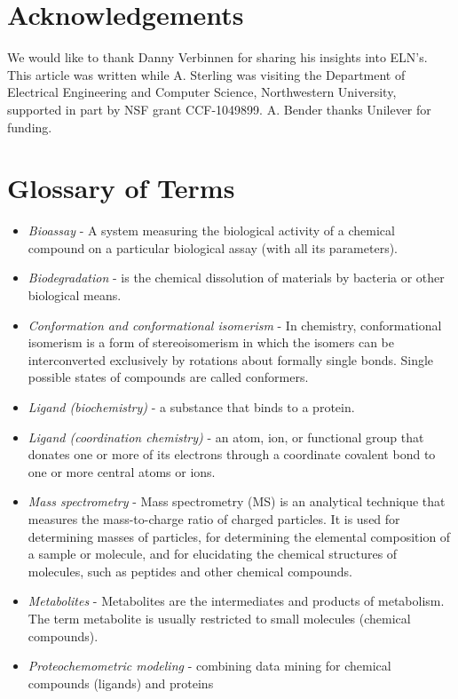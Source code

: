 \documentclass{sig-alternate}
\begin{document}
\section{Acknowledgements}
We would like to thank Danny Verbinnen for sharing his insights into
ELN's.  This article was written while A. Sterling was visiting the
Department of Electrical Engineering and Computer Science,
Northwestern University, supported in part by NSF grant CCF-1049899. A. Bender thanks Unilever for funding.




\appendix

\section{Glossary of Terms}
\begin{itemize}
\item \textit{Bioassay} - A system measuring the biological activity of a chemical compound on a particular
    biological assay (with all its parameters).
\item \textit{Biodegradation} - is the chemical dissolution of materials by bacteria or other biological means.
\item \textit{Conformation and conformational isomerism} - In chemistry, conformational isomerism is a form of
    stereoisomerism in which the isomers can be interconverted exclusively by rotations about formally single
    bonds.
    Single possible states of compounds are called conformers.
\item \textit{Ligand (biochemistry)} - a substance that binds to a protein.
\item \textit{Ligand (coordination chemistry)} - an atom, ion, or functional group that donates one or more of its
    electrons through a coordinate covalent bond to one or more central atoms or ions.
\item \textit{Mass spectrometry} - Mass spectrometry (MS) is an analytical technique that measures the
    mass-to-charge ratio of charged particles. It is used for determining masses of particles, for determining the
    elemental composition of a sample or molecule, and for elucidating the chemical structures of molecules, such
    as
    peptides and other chemical compounds.
\item \textit{Metabolites} - Metabolites are the intermediates and products of metabolism. The term metabolite is
    usually restricted to small molecules (chemical compounds).
\item \textit{Proteochemometric modeling} - combining data mining for chemical compounds (ligands) and proteins

\end{itemize}
\end{document}
